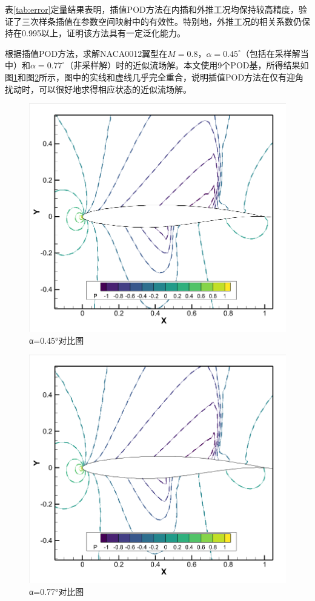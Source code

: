 表\ref{tab:error}定量结果表明，插值POD方法在内插和外推工况均保持较高精度，验证了三次样条插值在参数空间映射中的有效性。特别地，外推工况的相关系数仍保持在0.995以上，证明该方法具有一定泛化能力。

根据插值POD方法，求解NACA0012翼型在$M=0.8$，$\alpha=0.45^\circ$（包括在采样解当中）和$\alpha=0.77^\circ$（非采样解）时的近似流场解。本文使用9个POD基，所得结果如图\ref{fig:alpha0.45_result}和图\ref{fig:alpha0.77_result}所示，图中的实线和虚线几乎完全重合，说明插值POD方法在仅有迎角扰动时，可以很好地求得相应状态的近似流场解。
\begin{figure}[H]
    \centering
    \includegraphics[width=0.7\linewidth]{0.45对比图.png}
    \caption{α=0.45°对比图}
    \label{fig:alpha0.45_result}
\end{figure}
\begin{figure}[H]
    \centering
    \includegraphics[width=0.7\linewidth]{0.77对比图.png}
    \caption{α=0.77°对比图}
    \label{fig:alpha0.77_result}
\end{figure}
\label{sec:double_variable_pod}
